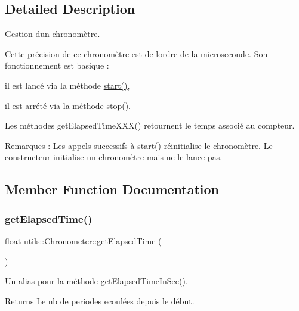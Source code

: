 \subsection{Detailed Description}
Gestion d\textquotesingle{}un chronomètre. 

Cette précision de ce chronomètre est de l\textquotesingle{}ordre de la microseconde. Son fonctionnement est \textquotesingle{}basique\textquotesingle{} \+:
\begin{DoxyItemize}
\item il est lancé via la méthode \hyperlink{classutils_1_1Chronometer_a174c35f7b276290813fe913ed5c82bd3}{start()},
\item il est arrété via la méthode \hyperlink{classutils_1_1Chronometer_ab5884be726059e187292392b76ba63e3}{stop()}.
\item Les méthodes get\+Elapsed\+Time\+X\+X\+X() retournent le temps associé au compteur.
\end{DoxyItemize}

Remarques \+: Les appels successifs à \hyperlink{classutils_1_1Chronometer_a174c35f7b276290813fe913ed5c82bd3}{start()} réinitialise le chronomètre. Le constructeur initialise un chronomètre mais ne le lance pas. 

\subsection{Member Function Documentation}
\mbox{\label{classutils_1_1Chronometer_acf0f4b7283770941a7d3e134160790de}} 
\subsubsection{\texorpdfstring{get\+Elapsed\+Time()}{getElapsedTime()}}
{\footnotesize\ttfamily float utils\+::\+Chronometer\+::get\+Elapsed\+Time (\begin{DoxyParamCaption}{ }\end{DoxyParamCaption})}



Un alias pour la méthode \hyperlink{classutils_1_1Chronometer_a935aa20dd1791cfc8aec203a8838598d}{get\+Elapsed\+Time\+In\+Sec()}. 

\begin{DoxyReturn}{Returns}
Le nb de periodes ecoulées depuis le début. 
\end{DoxyReturn}
\mbox{\label{classutils_1_1Chronometer_a8c641a39ccca4bf655bb09d9c1cd8d9b}} 
